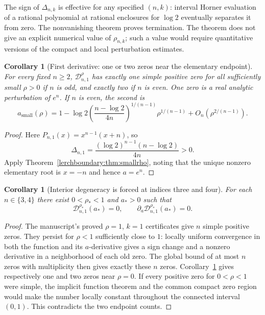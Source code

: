 \documentclass[11pt,a4paper]{article}
\newtheorem{corollary}[theorem]{Corollary}
\theoremstyle{definition}
\theoremstyle{remark}
\numberwithin{equation}{section}
\begin{document}
The sign of $\Delta_{n,k}$ is effective for any specified $(n,k)$:
interval Horner evaluation of a rational polynomial at rational
enclosures for $\log2$ eventually separates it from zero.  The
nonvanishing theorem proves termination.  The theorem does not give
an explicit numerical value of $\rho_{n,k}$; such a value would require
quantitative versions of the compact and local perturbation estimates.

\begin{corollary}[First derivative: one or two zeros near the elementary endpoint]
\label{lerchboundary:cor:k1}
For every fixed $n\geq2$, $\mathcal D_{n,1}^{\rho}$ has exactly one
simple positive zero for all sufficiently small $\rho>0$ if $n$ is
odd, and exactly two if $n$ is even.  One zero is a real analytic
perturbation of $e^n$.  If $n$ is even, the second is
\begin{equation}\label{lerchboundary:eq:k1small}
 a_{\mathrm{small}}(\rho)
 =1-\log2\left(\frac{n-\log2}{4n}\right)^{1/(n-1)}
      \rho^{1/(n-1)}+O_n(\rho^{2/(n-1)}).
\end{equation}
\end{corollary}

\begin{proof}
Here $P_{n,1}(x)=x^{n-1}(x+n)$, so
\[
 \Delta_{n,1}=
   \frac{(\log2)^{n-1}(n-\log2)}{4n}>0.
\]
Apply Theorem~\ref{lerchboundary:thm:smallrho}, noting that the unique
nonzero elementary root is $x=-n$ and hence $a=e^n$.
\end{proof}

\begin{corollary}[Interior degeneracy is forced at indices three and four]
\label{lerchboundary:cor:degeneracy}
For each $n\in\{3,4\}$ there exist $0<\rho_*<1$ and $a_*>0$ such that
\[
 \mathcal D_{n,1}^{\rho_*}(a_*)=0,
 \qquad \partial_a\mathcal D_{n,1}^{\rho_*}(a_*)=0.
\]
\end{corollary}

\begin{proof}
The manuscript's proved $\rho=1$, $k=1$ certificates give $n$ simple
positive zeros.  They persist for $\rho<1$ sufficiently close to $1$:
locally uniform convergence in both the function and its $a$-derivative
gives a sign change and a nonzero derivative in a neighborhood of each
old zero. The global bound of at most $n$ zeros with multiplicity then
gives exactly these $n$ zeros.
Corollary~\ref{lerchboundary:cor:k1} gives respectively one and two
zeros near $\rho=0$. If every positive zero for $0<\rho<1$ were simple,
the implicit function theorem and the common compact zero region would
make the number locally constant throughout the connected interval
$(0,1)$. This contradicts the two endpoint counts.
\end{proof}
\end{document}
